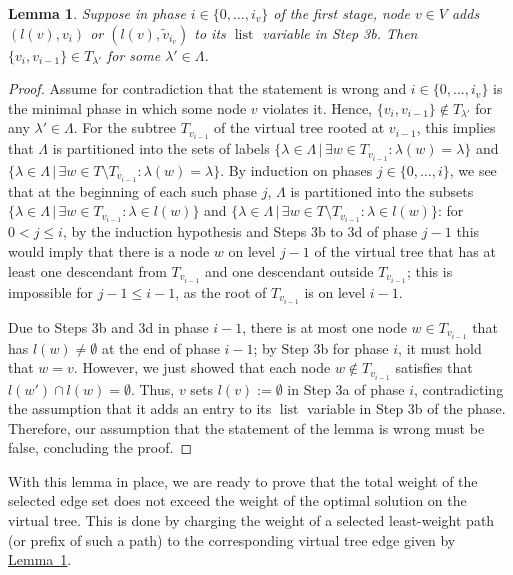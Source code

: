 \documentclass[letterpaper,11pt]{article}
\newtheorem{lemma}[theorem]{Lemma}
\newcommand{\namedref}[2]{\hyperref[#2]{#1~\ref*{#2}}}
\newcommand{\lemmaref}[1]{\namedref{Lemma}{#1}}
\newcommand{\Comp}{\lambda}
\DeclareMathOperator{\unsent}{list}
\begin{document}
\begin{lemma}\label{lemma:stage1_subtree}
Suppose in phase $i\in \{0,\ldots,i_v\}$ of the first stage, node $v\in V$ adds
$(l(v),v_i)$ or $(l(v),\tilde{v}_{i_v})$ to its $\unsent$ variable in Step 3b.
Then $\{v_i,v_{i-1}\}\in T_{\Comp'}$ for some $\Comp'\in \Lambda$.
\end{lemma}
\begin{proof}
Assume for contradiction that the statement is wrong and $i\in \{0,\ldots,i_v\}$
is the minimal phase in which some node $v$ violates it. Hence,
$\{v_i,v_{i-1}\}\notin T_{\Comp'}$ for any $\Comp' \in \Lambda$. For the subtree
$T_{v_{i-1}}$ of the virtual tree rooted at $v_{i-1}$, this implies that
$\Lambda$ is partitioned into the sets of labels $\{\Comp\in \Lambda\,|\,\exists
w\in T_{v_{i-1}}:\Comp(w)=\Comp\}$ and $\{\Comp\in \Lambda\,|\,\exists w\in
T\setminus T_{v_{i-1}}:\Comp(w)=\Comp\}$. By induction on phases $j\in
\{0,\ldots,i\}$, we see that at the beginning of each such phase $j$, $\Lambda$
is partitioned into the subsets $\{\Comp\in \Lambda\,|\,\exists w\in
T_{v_{i-1}}:\Comp\in l(w)\}$ and $\{\Comp\in \Lambda\,|\,\exists w\in T\setminus
T_{v_{i-1}}:\Comp\in l(w)\}$: for $0<j\leq i$, by the induction hypothesis and
Steps 3b to 3d of phase $j-1$ this would imply that there is a node $w$ on level
$j-1$ of the virtual tree that has at least one descendant from $T_{v_{i-1}}$
and one descendant outside $T_{v_{i-1}}$; this is impossible for $j-1\leq i-1$,
as the root of $T_{v_{i-1}}$ is on level $i-1$.

Due to Steps 3b and 3d in phase $i-1$, there is at most one node $w\in
T_{v_{i-1}}$ that has $l(w)\neq \emptyset$ at the end of phase $i-1$; by Step 3b
for phase $i$, it must hold that $w=v$. However, we just showed that each node
$w\notin T_{v_{i-1}}$ satisfies that $l(w')\cap l(w)=\emptyset$. Thus, $v$ sets
$l(v):=\emptyset$ in Step 3a of phase $i$, contradicting the assumption that it
adds an entry to its $\unsent$ variable in Step 3b of the phase. Therefore, our
assumption that the statement of the lemma is wrong must be false, concluding
the proof.
\end{proof}

With this lemma in place, we are ready to prove that the total weight of the
selected edge set does not exceed the weight of the optimal solution on the
virtual tree. This is done by charging the weight of a selected least-weight
path (or prefix of such a path) to the corresponding virtual tree edge given
by \lemmaref{lemma:stage1_subtree}.
\end{document}
